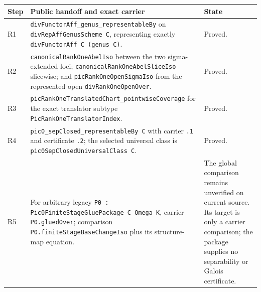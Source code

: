 \begin{center}
\begin{tabular}{p{}p{}p{}}
\textbf{Step} & \textbf{Public handoff and exact carrier} & \textbf{State}\\ \hline
R1 & \texttt{divFunctorAff\_genus\_representableBy} on
\texttt{divRepAffGenusScheme C}, representing exactly
\texttt{divFunctorAff C (genus C)}. & Proved.\\
R2 & \texttt{canonicalRankOneAbelIso} between the two sigma-extended loci;
\texttt{canonicalRankOneAbelSliceIso} slicewise; and
\texttt{picRankOneOpenSigmaIso} from the represented open
\texttt{divRankOneOpenOver}. & Proved.\\
R3 & \texttt{picRankOneTranslatedChart\_pointwiseCoverage} for the exact
translator subtype \texttt{PicRankOneTranslatorIndex}. & Proved.\\
R4 & \texttt{pic0\_sepClosed\_representableBy C} with carrier
\texttt{.1} and certificate \texttt{.2}; the selected universal class is
\texttt{pic0SepClosedUniversalClass C}. & Proved.\\
R5 & For arbitrary legacy
\texttt{P0 : Pic0FiniteStageGluePackage C\_Omega K}, carrier
\texttt{P0.gluedOver}; comparison \texttt{P0.finiteStageBaseChangeIso} plus
its structure-map equation. & The global comparison remains unverified on
current source.  Its target is only a carrier comparison; the package supplies
no separability or Galois certificate.\\
\end{tabular}
\end{center}


